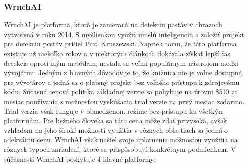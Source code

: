 \documentclass[slovak,master,dept460,male,cpp,cpdeclaration]{diploma}
\begin{document}
\subsubsection{WrnchAI}
WrnchAI\cite{wrnchAI} je platforma, ktorá je zameraná na detekciu postáv v obrazoch vytvorená v roku 2014. S myšlienkou využiť umelú inteligenciu a založiť projekt pre detekciu postáv prišiel Paul Kruszewski. Napriek tomu, že táto platforma existuje už niekoľko rokov a v niektorých článkoch\cite{openposeVsWrnchAI} dokázala získať lepší čas detekcie oproti iným metódam,  nestala sa veľmi populárnym nástrojom medzi vývojármi. Jedným z hlavných dôvodov je to, že knižnica nie je voľne dostupná pre vývojárov a jedná sa o platený projekt bez voľného prístupu k zdrojovému kódu. Súčasná cenová politika základnej verzie sa pohybuje na úrovni \$500 za mesiac používania s možnosťou vyskúšania trial verzie na prvý mesiac zadarmo. Trial verzia však funguje v obmedzenom režime  bez prístupu ku všetkým platformám. Pre bežného človeka sa táto cena môže zdať privysoká, avšak vzhľadom na jeho široké možnosti využitia  v rôznych oblastiach sa jedná o adekvátnu cenu. WrnchAI však našiel svoje uplatnenie možnosťou využitia na rôznych typoch zariadení, ktoré sa prispôsobujú konkrétnym podmienkam. V súčasnosti WrnchAI poskytuje 4 hlavné platformy:
\end{document}
